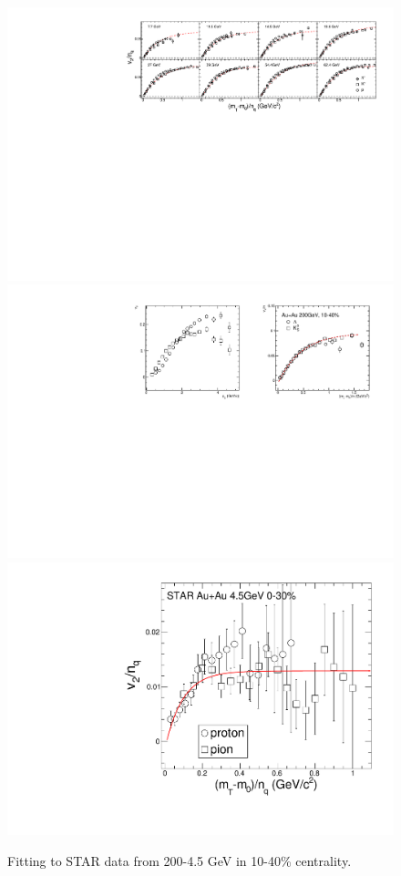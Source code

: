 \begin{figure}
    \centering
    \includegraphics[scale=0.7]{FXT3gev/chapter4/fig/v2ncq_energy.pdf}
    \includegraphics[scale=0.5]{FXT3gev/chapter4/fig/lam_ks0_v2ncq.pdf}
    \includegraphics[scale=0.25]{FXT3gev/chapter4/fig/4_5GeV_ncq.pdf}
    \caption{Fitting to STAR data from 200-4.5 GeV in 10-40\% centrality.}
    \label{fig:v2pt_ncq_fit}
\end{figure} 

